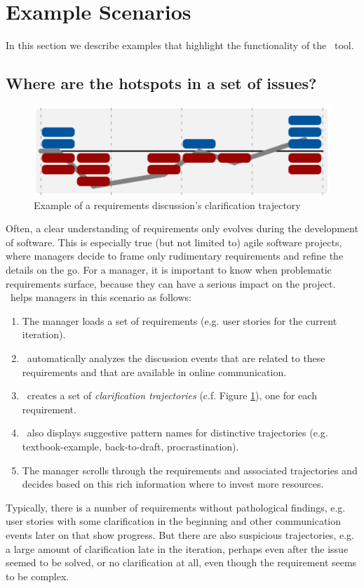 \section{Example Scenarios}
In this section we describe examples that highlight the functionality of the \viss\ tool.

\subsection{Where are the hotspots in a set of issues?}
\begin{figure}[b]
\includegraphics[width=\columnwidth]{img/example-trajectory}
\caption{Example of a requirements discussion's clarification trajectory}
\label{fig:example-trajectory}
\end{figure}
Often, a clear understanding of requirements only evolves during the development of software.
This is especially true (but not limited to) agile software projects, where managers decide to frame only rudimentary requirements and refine the details on the go.
For a manager, it is important to know when problematic requirements surface, because they can have a serious impact on the project.
\viss\ helps managers in this scenario as follows:
\begin{enumerate}
\item The manager loads a set of requirements (e.g. user stories for the current iteration).
\item \viss\ automatically analyzes the discussion events that are related to these requirements and that are available in online communication.  
\item \viss\ creates a set of \emph{clarification trajectories} (c.f. Figure \ref{fig:example-trajectory}), one for each requirement. 
\item \viss\ also displays suggestive pattern names for distinctive trajectories (e.g. textbook-example, back-to-draft, procrastination).
\item The manager scrolls through the requirements and associated trajectories and decides based on this rich information where to invest more resources.
\end{enumerate}
Typically, there is a number of requirements without pathological findings, e.g. user stories with some clarification in the beginning and other communication events later on that show progress. 
But there are also suspicious trajectories, e.g. a large amount of clarification late in the iteration, perhaps even after the issue seemed to be solved, or no clarification at all, even though the requirement seems to be complex.


